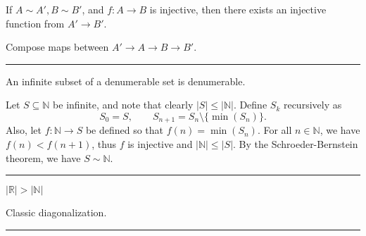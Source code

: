 \begin{exercise}
    If $A\sim A',B\sim B'$, and $f:A\to B$ is injective, then there exists an injective function from $A'\to B'$.
\end{exercise}
\begin{solution}
    Compose maps between $A'\to A\to B\to B'$.
\end{solution}
\hrule

\begin{exercise}
    An infinite subset of a denumerable set is denumerable.
\end{exercise}
\begin{solution}
    Let $S\subseteq\mathbb{N}$ be infinite, and note that clearly $|S|\le|\mathbb{N}|$. Define $S_k$ recursively as
    $$S_0 = S,\qquad S_{n+1} = S_n\setminus\{\min (S_n)\}.$$
    Also, let $f:\mathbb{N}\to S$ be defined so that $f(n) = \min(S_n)$. For all $n\in\mathbb{N}$, we have $f(n) < f(n+1)$, thus $f$ is injective and $|\mathbb{N}|\le |S|$. By the Schroeder-Bernstein theorem, we have $S\sim\mathbb{N}$.
\end{solution}
\hrule

\begin{exercise}
    $|\mathbb{R}| > |\mathbb{N}|$
\end{exercise}
\begin{solution}
    Classic diagonalization.
\end{solution}
\hrule

